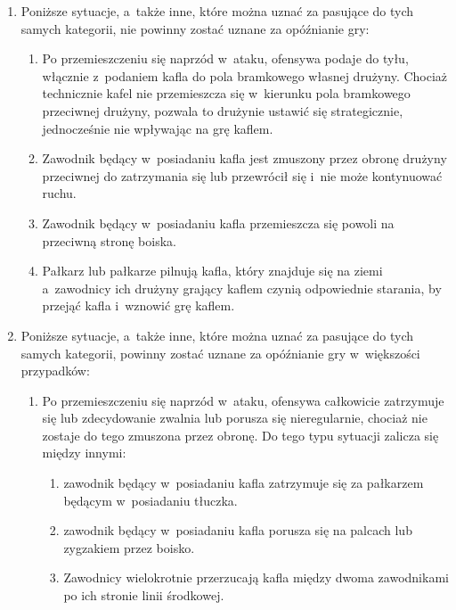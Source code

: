 \documentclass[12pt]{article}
\begin{document}
\begin{enumerate}
	\item Poniższe sytuacje, a~także inne, które można uznać za pasujące do
	      tych samych kategorii, nie powinny zostać uznane za opóźnianie gry:

	      \begin{enumerate}
		      \item  Po przemieszczeniu się naprzód w~ataku, ofensywa podaje do tyłu,
		            włącznie z~podaniem kafla do pola bramkowego własnej drużyny. Chociaż
		            technicznie kafel nie przemieszcza się w~kierunku pola bramkowego
		            przeciwnej drużyny, pozwala to drużynie ustawić się strategicznie,
		            jednocześnie nie wpływając na grę kaflem.

		      \item Zawodnik będący w~posiadaniu kafla jest zmuszony przez obronę
		            drużyny przeciwnej do zatrzymania się lub przewrócił się i~nie może
		            kontynuować ruchu.

		      \item Zawodnik będący w~posiadaniu kafla przemieszcza się powoli na
		            przeciwną stronę boiska.

		      \item Pałkarz lub pałkarze pilnują kafla, który znajduje się na ziemi a~zawodnicy ich drużyny grający kaflem czynią odpowiednie starania, by
		            przejąć kafla i~wznowić grę kaflem.
	      \end{enumerate}
	\item Poniższe sytuacje, a~także inne, które można uznać za pasujące do
	      tych samych kategorii, powinny zostać uznane za opóźnianie gry w~większości przypadków:
	      \begin{enumerate}
		      \item Po przemieszczeniu się naprzód w~ataku, ofensywa całkowicie
		            zatrzymuje się lub zdecydowanie zwalnia lub porusza się nieregularnie,
		            chociaż nie zostaje do tego zmuszona przez obronę. Do tego typu sytuacji
		            zalicza się między innymi:

		            \begin{enumerate}
			            \item
			                  zawodnik będący w~posiadaniu kafla zatrzymuje się za pałkarzem będącym
			                  w~posiadaniu tłuczka.
			            \item
			                  zawodnik będący w~posiadaniu kafla porusza się na palcach lub
			                  zygzakiem przez boisko.
			            \item
			                  Zawodnicy wielokrotnie przerzucają kafla między dwoma zawodnikami po
			                  ich stronie linii środkowej.
		            \end{enumerate}


\end{enumerate}
\end{enumerate}
\end{document}

